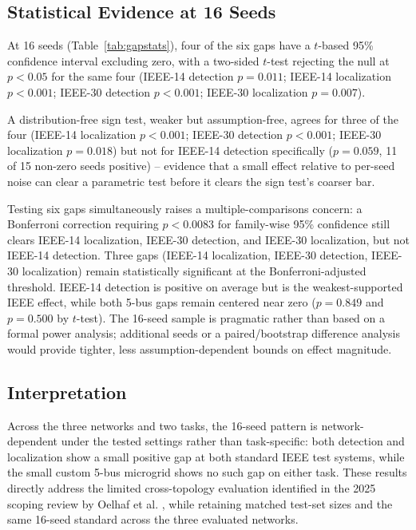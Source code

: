 \documentclass[conference]{IEEEtran}
\begin{document}
\subsection{Statistical Evidence at 16 Seeds}
\label{sec:scale-stats}
At 16 seeds (Table~\ref{tab:gapstats}), four of the six gaps have a $t$-based 95\% confidence interval excluding zero, with a two-sided $t$-test rejecting the null at $p<0.05$ for the same four (IEEE-14 detection $p=0.011$; IEEE-14 localization $p<0.001$; IEEE-30 detection $p<0.001$; IEEE-30 localization $p=0.007$). 

A distribution-free sign test, weaker but assumption-free, agrees for three of the four (IEEE-14 localization $p<0.001$; IEEE-30 detection $p<0.001$; IEEE-30 localization $p=0.018$) but not for IEEE-14 detection specifically ($p=0.059$, 11 of 15 non-zero seeds positive) -- evidence that a small effect relative to per-seed noise can clear a parametric test before it clears the sign test's coarser bar. 

Testing six gaps simultaneously raises a multiple-comparisons concern: a Bonferroni correction requiring $p<0.0083$ for family-wise 95\% confidence still clears IEEE-14 localization, IEEE-30 detection, and IEEE-30 localization, but not IEEE-14 detection. Three gaps (IEEE-14 localization, IEEE-30 detection, IEEE-30 localization) remain statistically significant at the Bonferroni-adjusted threshold. IEEE-14 detection is positive on average but is the weakest-supported IEEE effect, while both 5-bus gaps remain centered near zero ($p=0.849$ and $p=0.500$ by $t$-test). The 16-seed sample is pragmatic rather than based on a formal power analysis; additional seeds or a paired/bootstrap difference analysis would provide tighter, less assumption-dependent bounds on effect magnitude.

\subsection{Interpretation}
Across the three networks and two tasks, the 16-seed pattern is network-dependent under the tested settings rather than task-specific: both detection and localization show a small positive gap at both standard IEEE test systems, while the small custom 5-bus microgrid shows no such gap on either task. These results directly address the limited cross-topology evaluation identified in the 2025 scoping review by Oelhaf et al. \cite{oelhaf2025scoping}, while retaining matched test-set sizes and the same 16-seed standard across the three evaluated networks.
\end{document}
